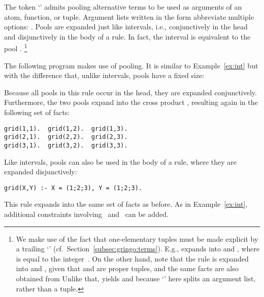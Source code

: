 The token `\code{;}' admits pooling alternative terms
to be used as arguments of an atom, function, or tuple.
Argument lists written in the form  abbreviate multiple options:
.
Pools are expanded just like intervals, i.e.,
conjunctively in the head and disjunctively in the body of a rule.
In fact, the interval  is equivalent to the pool .%
\footnote{%
We make use of the fact that one-elementary tuples
must be made explicit by a trailing `\code{,}' (cf.\ Section~\ref{subsec:gringo:terms}).
E.g.,  expands into  and ,
where  is equal to the integer~.
On the other hand, note that the rule
is expanded into 
 and ,
given that  and  are proper tuples,
and the same facts are also obtained from
Unlike that,  yields
 and 
because `\code{;}' here splits an argument list,
rather than a tuple.}
\begin{example}\label{ex:pool}
The following program makes use of pooling.
It is similar to Example~\ref{ex:int}
but with the difference that, unlike intervals, pools have a fixed size:%

%
Because all pools in this rule occur in the head,
they are expanded conjunctively.
Furthermore, the two pools expand into the cross product ,
resulting again in the following set of facts:
\begin{lstlisting}[numbers=none]
grid(1,1).  grid(1,2).  grid(1,3).
grid(2,1).  grid(2,2).  grid(2,3).
grid(3,1).  grid(3,2).  grid(3,3).
\end{lstlisting}
Like intervals, pools can also be used in the body of a rule,
where they are expanded disjunctively:
\begin{lstlisting}
grid(X,Y) :- X = (1;2;3), Y = (1;2;3).
\end{lstlisting}
This rule expands into the same set of facts as before.
As in Example~\ref{ex:int}, additional constraints involving~ and~ can be added.
\end{example}


